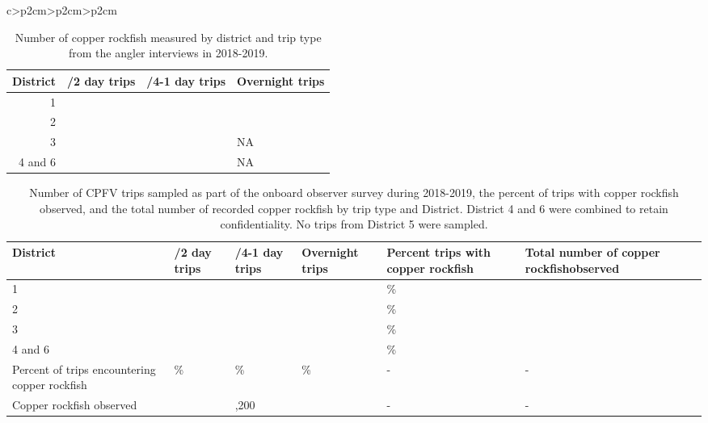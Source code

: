 \documentclass[11pt,
  letterpaper,
]{article}
\begin{document}
\begin{longtable}[t]{c>{\centering\arraybackslash}p{2cm}>{\centering\arraybackslash}p{2cm}>{\centering\arraybackslash}p{2cm}}
\begin{table}[H]
\centering\centering\centering
\caption{\label{tab:copper-lengths}Number of copper rockfish measured by district and trip type from the angler interviews in 2018-2019.}
\centering
\fontsize{10}{12}\selectfont
\fontsize{10}{12}\selectfont
\begin{tabular}[t]{r>{\raggedleft\arraybackslash}p{2cm}>{\raggedleft\arraybackslash}p{2cm}>{\raggedleft\arraybackslash}p{2cm}}
\toprule
District & 1/2 day trips & 3/4-1 day trips & Overnight trips\\
\midrule
1 & 240 & 240 & 69\\
2 & 388 & 1311 & 189\\
3 & 313 & 664 & NA\\
4 and 6 & 12 & 302 & NA\\
\bottomrule
\end{tabular}
\end{table}

\pagebreak

\begin{landscape}\begin{table}[H]
\centering
\caption{\label{tab:onboard-trips}Number of CPFV trips sampled as part of the onboard observer survey during 2018-2019, the percent of trips with copper rockfish observed, and the total number of recorded copper rockfish by trip type and District. District 4 and 6 were combined to retain confidentiality.  No trips from District 5 were sampled.}
\centering
\fontsize{10}{12}\selectfont
\fontsize{10}{12}\selectfont
\begin{tabular}[t]{l>{\raggedright\arraybackslash}p{1.83cm}>{\raggedright\arraybackslash}p{1.83cm}>{\raggedright\arraybackslash}p{1.83cm}>{\raggedright\arraybackslash}p{1.83cm}>{\raggedright\arraybackslash}p{1.83cm}}
\toprule
District & 1/2 day trips & 3/4-1 day trips & Overnight trips & Percent trips with copper rockfish & Total number of copper rockfishobserved\\
\midrule
1 & 435 & 119 & 5 & 21\% & 296\\
2 & 36 & 93 & 4 & 72\% & 783\\
3 & 86 & 55 & 0 & 67\% & 864\\
4 and 6 & 10 & 69 & 0 & 61\% & 150\\
Percent of trips encountering copper rockfish & 26\% & 60\% & 89\% & - & -\\
Copper rockfish observed & 399 & 1,200 & 121 & - & -\\
\bottomrule
\end{tabular}
\end{table}
\end{landscape}


\end{longtable}
\end{document}
